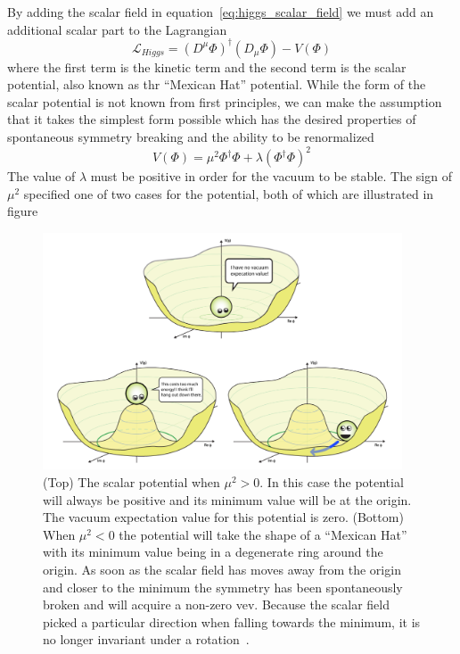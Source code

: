 By adding the scalar field in equation~\ref{eq:higgs_scalar_field} we must add an additional scalar part to the Lagrangian
\begin{equation}
	\mathcal{L}_{Higgs}=\left(D^{\mu}\Phi\right)^{\dagger}\left(D_{\mu}\Phi\right)-V\left(\Phi\right)
\end{equation}
where the first term is the kinetic term and the second term is the scalar potential, also known as thr ``Mexican Hat'' potential.
While the form of the scalar potential is not known from first principles, we can make the assumption that it takes the simplest form possible which has the desired properties of spontaneous symmetry breaking and the ability to be renormalized
\begin{equation}
	V\left(\Phi\right)=\mu^{2}\Phi^{\dagger}\Phi+\lambda\left(\Phi^{\dagger}\Phi\right)^{2}
\end{equation}
The value of $\lambda$ must be positive in order for the vacuum to be stable.
The sign of $\mu^{2}$ specified one of two cases for the potential, both of which are illustrated in figure 

\begin{figure}[hbt]
	\begin{center}
		\includegraphics[width=0.95\textwidth]{figures/Chapter2/HiggsVEV.png}
		\caption{(Top) The scalar potential when $\mu^{2}>0$. In this case the potential will always be positive and its minimum value will be at the origin. The vacuum expectation value for this potential is zero. (Bottom) When $\mu^{2}<0$ the potential will take the shape of a ``Mexican Hat'' with its minimum value being in a degenerate ring around the origin. As soon as the scalar field has moves away from the origin and closer to the minimum the symmetry has been spontaneously broken and will acquire a non-zero vev. Because the scalar field picked a particular direction when falling towards the minimum, it is no longer invariant under a rotation~\cite{Tanedo}.}
		\label{fig:higgs_vev}
	\end{center}
\end{figure}






